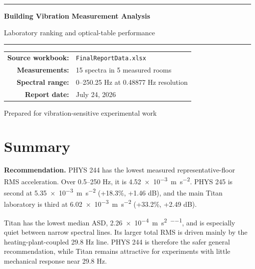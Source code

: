 \documentclass[11pt]{article}
\begin{document}
\hypersetup{pageanchor=false}
\begin{titlepage}
  \centering
  \vspace*{1.2in}
  {\color{navy}\rule{\textwidth}{1.2pt}\par}
  \vspace{0.45in}
  {\Huge\bfseries Building Vibration Measurement Analysis\par}
  \vspace{0.18in}
  {\Large Laboratory ranking and optical-table performance\par}
  \vspace{0.45in}
  {\color{navy}\rule{\textwidth}{1.2pt}\par}
  \vfill
  \begin{tabular}{rl}
    \textbf{Source workbook:} & \texttt{FinalReportData.xlsx}\\
    \textbf{Measurements:} & 15 spectra in 5 measured rooms\\
    \textbf{Spectral range:} & 0--250.25 Hz at 0.48877 Hz resolution\\
    \textbf{Report date:} & July 24, 2026\\
  \end{tabular}
  \vfill
  {\large Prepared for vibration-sensitive experimental work\par}
\end{titlepage}

\hypersetup{pageanchor=true}
\tableofcontents
\clearpage
{}

\section{Summary}

\textbf{Recommendation.} PHYS 244 has the lowest measured representative-floor
RMS acceleration. Over 0.5--250 Hz, it is
\SI{4.52e-3}{\meter\per\second\squared}. PHYS 245 is second at
\SI{5.35e-3}{\meter\per\second\squared} (+18.3\%, +1.46 dB), and the main
Titan laboratory is third at
\SI{6.02e-3}{\meter\per\second\squared} (+33.2\%, +2.49 dB).

Titan has the lowest median ASD,
\SI{2.26e-4}{\meter\per\second\squared\per\sqrthertz}, and is especially
quiet between narrow spectral lines. Its larger total RMS is driven mainly
by the heating-plant-coupled 29.8 Hz line. PHYS 244 is therefore the safer
general recommendation, while Titan remains attractive for experiments with
little mechanical response near 29.8 Hz.
\end{document}
